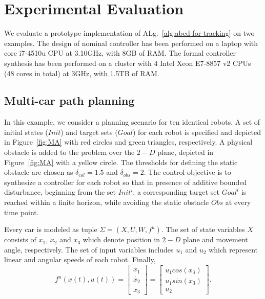 
\section{Experimental Evaluation}\label{sec:experiments}
We evaluate a prototype implementation of ALg.~\ref{alg:abcd-for-tracking}
on two examples. 
The design of nominal controller has been performed on a laptop with core i7-4510u CPU at 3.10GHz, with 8GB of
RAM.
The formal controller synthesis has been performed
on a cluster with 4 Intel Xeon E7-8857 v2 CPUs (48 cores in total) at 3GHz, with 1.5TB of
RAM. 

\subsection{Multi-car path planning}\label{sec:MultiAgent}

In this example, we consider a planning scenario for ten identical robots. A set of initial states ($Init$) and target sets ($Goal$) for each robot is specified and depicted in Figure~\ref{fig:MA} with red circles and green triangles, respectively. A physical obstacle is added to the problem over the $2-D$ plane, depicted in Figure~\ref{fig:MA} with a yellow circle. The thresholds for defining the static obstacle are chosen as $\delta_{col}=1.5$ and $\delta_{obs}=2$. The control objective is to synthesize a controller for each robot so that in presence of additive bounded disturbance, beginning from the set $Init^i$, a corresponding target set $Goal^i$ is reached within a finite horizon, while avoiding the static obstacle $Obs$ at every time point. 

Every car is modeled as tuple $\Sigma=(X,U,W,f^u)$. The set of state variables $X$ consists of $x_1$, $x_2$ and $x_3$ which denote position in $2-D$ plane and movement angle, respectively. The set of input variables includes $u_1$ and $u_2$ which represent linear and angular speeds of each robot. Finally,
\begin{equation}\label{eq:unicycle_ss}
	f^{u}(x(t),u(t))=
	\begin{bmatrix}
		\dot{x_1}\\
		\dot{x_2}\\
		\dot{x_3}
	\end{bmatrix}=
	\begin{bmatrix}
		u_1cos(x_3)\\
		u_1sin(x_3)\\
		u_2
	\end{bmatrix}.
\end{equation}



